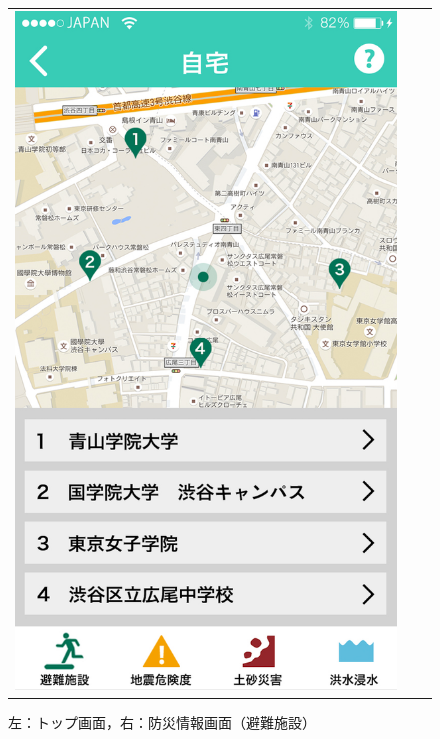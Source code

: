 \documentclass[a4paper]{jsarticle}
\begin{document}
\begin{figure}[H]
\begin{center}
\begin{tabular}{ccc}
\begin{minipage}{0.3\hsize}
      \includegraphics[width=\hsize]{./images/mbs_facility.jpg}
    \end{minipage}
  \end{tabular}
    \caption{左：トップ画面，右：防災情報画面（避難施設）}
    \label{fig:screen-structure-01}
  \end{center}
\end{figure}
\fi
\end{document}
